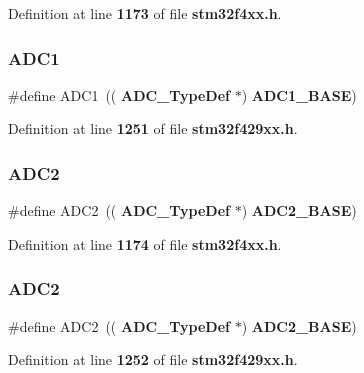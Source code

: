 Definition at line \textbf{ 1173} of file \textbf{ stm32f4xx.\+h}.

\mbox{\label{group__Peripheral__declaration_ga90d2d5c526ce5c0a551f533eccbee71a}} 
\subsubsection{A\+D\+C1\hspace{0.1cm}{\footnotesize\ttfamily [2/2]}}
{\footnotesize\ttfamily \#define A\+D\+C1~((\textbf{ A\+D\+C\+\_\+\+Type\+Def} $\ast$) \textbf{ A\+D\+C1\+\_\+\+B\+A\+SE})}



Definition at line \textbf{ 1251} of file \textbf{ stm32f429xx.\+h}.

\mbox{\label{group__Peripheral__declaration_gac5503ae96c26b4475226f96715a1bf1e}} 
\subsubsection{A\+D\+C2\hspace{0.1cm}{\footnotesize\ttfamily [1/2]}}
{\footnotesize\ttfamily \#define A\+D\+C2~((\textbf{ A\+D\+C\+\_\+\+Type\+Def} $\ast$) \textbf{ A\+D\+C2\+\_\+\+B\+A\+SE})}



Definition at line \textbf{ 1174} of file \textbf{ stm32f4xx.\+h}.

\mbox{\label{group__Peripheral__declaration_gac5503ae96c26b4475226f96715a1bf1e}} 
\subsubsection{A\+D\+C2\hspace{0.1cm}{\footnotesize\ttfamily [2/2]}}
{\footnotesize\ttfamily \#define A\+D\+C2~((\textbf{ A\+D\+C\+\_\+\+Type\+Def} $\ast$) \textbf{ A\+D\+C2\+\_\+\+B\+A\+SE})}



Definition at line \textbf{ 1252} of file \textbf{ stm32f429xx.\+h}.


